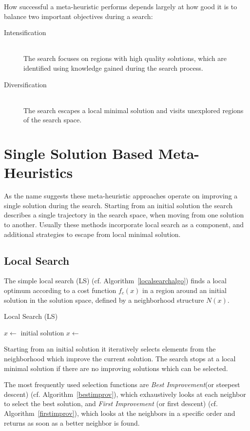 How successful a meta-heuristic performs depends largely at how good it is to balance two important objectives during a search:
\begin{description}
\item[Intensification]\hfill \\
The search focuses on regions with high quality solutions, which are identified using knowledge gained during the search process.
\item[Diversification]\hfill \\
The search escapes a local minimal solution and visits unexplored regions of the search space.
\end{description}

 
\section{Single Solution Based Meta-Heuristics}\label{sec:single}
As the name suggests these meta-heuristic approaches operate on improving a single solution during the search. 
Starting from an initial solution the search describes a single trajectory in the search space, when moving from one solution to another. 
Usually these methods incorporate local search as a component, and additional strategies to escape from local minimal solution.  

\subsection{Local Search}\label{sec:ls}
The simple local search (LS) (cf. Algorithm~\ref{localsearchalgo}) finds a local optimum according to a cost function $f_c(x)$ in a region around an initial solution in the solution space, defined by a neighborhood structure $N(x)$. 

\begin{algorithm}
\caption{Local Search  (LS)}
\label{localsearchalgo}
\begin{algorithmic}[1] 
\State $x\gets$ initial solution
\Repeat
\State $x\gets$ 
\end{algorithmic}
\end{algorithm}

Starting from an initial solution it iteratively selects elements from the neighborhood which improve the current solution. 
The search stops at a local minimal solution if there are no improving solutions which can be selected.

The most frequently used selection functions are \emph{Best Improvement}(or steepest descent) (cf. Algorithm~\ref{bestimprov}), which exhaustively looks at each neighbor to select the best solution, and \emph{First Improvement} (or first descent) (cf. Algorithm~\ref{firstimprov}), which looks at the neighbors in a specific order and returns as soon as a better neighbor is found. 

